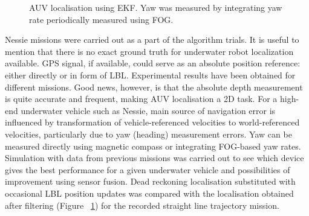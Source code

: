 \begin{figure}[htb]
\caption{AUV localisation using EKF. Yaw was measured by integrating yaw rate periodically measured using FOG.}
\vspace{-10pt}
\label{fig:auv-sim-straight}
\end{figure} 
Nessie missions were carried out as a part of the algorithm trials. It is useful to mention that there is no exact ground truth for underwater robot localization available. GPS signal, if available, could serve as an absolute position reference: either directly or in form of LBL. Experimental results have been obtained for different missions. Good news, however, is that the absolute depth measurement is quite accurate and frequent, making AUV localisation a 2D task.
For a high-end underwater vehicle such as Nessie, main source of navigation error is influenced by transformation of vehicle-referenced velocities to world-referenced velocities, particularly due to yaw (heading) measurement errors. Yaw can be measured directly using magnetic compass or integrating FOG-based yaw rates. Simulation with data from previous missions was carried out to see which device gives the best performance for a given underwater vehicle and possibilities of improvement using sensor fusion. Dead reckoning localisation substituted with occasional LBL position updates was compared with the localisation obtained after filtering (Figure ~\ref{fig:auv-sim-straight}) for the recorded straight line trajectory mission. 

